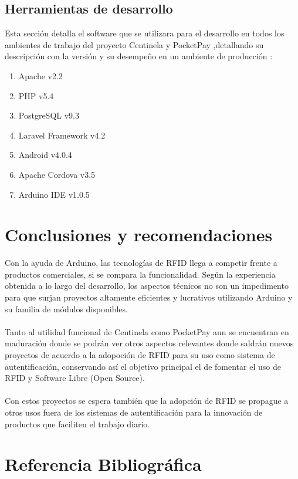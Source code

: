 \documentclass[11pt,twocolumn]{article}
\begin{document}
	\subsection{Herramientas de desarrollo}
	
	Esta secci\'on detalla el software que se utilizara para el desarrollo en 
	todos los ambientes de trabajo del proyecto Centinela y PocketPay ,detallando su 
	descripci\'on con la versi\'on y su desempe\~no en un ambiente de producci\'on :
	
	\begin{enumerate}
		\item Apache v2.2
		\item PHP v5.4
		\item PostgreSQL v9.3
		\item Laravel Framework v4.2
		\item Android v4.0.4
		\item Apache Cordova v3.5
		\item Arduino IDE v1.0.5
	\end{enumerate}

\section{Conclusiones y recomendaciones}

Con la ayuda de Arduino, las tecnolog\'ias de RFID llega a competir  frente a 
productos comerciales, si se compara la funcionalidad. Seg\'un la experiencia 
obtenida a lo largo del desarrollo, los  aspectos t\'ecnicos no son un impedimento 
para que surjan proyectos altamente eficientes y lucrativos  utilizando Arduino 
y su familia de m\'odulos disponibles. \\
\\	
Tanto al utilidad funcional de Centinela como PocketPay aun se encuentran en maduraci\'on donde se podr\'an ver otros aspectos relevantes donde saldr\'an nuevos proyectos de acuerdo a la adopoci\'on de RFID para su uso como sistema de autentificaci\'on, conservando as\'i el objetivo principal el de fomentar el uso de RFID y Software Libre (Open Source).\\
\\
Con estos proyectos se espera tambi\'en que la adopci\'on de RFID se propague a otros usos fuera de los sistemas de autentificaci\'on para la innovaci\'on de productos que faciliten el trabajo diario.


\section{Referencia Bibliogr\'afica}
	
\end{document}
